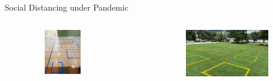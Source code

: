 \begin{frame}{Social Distancing under Pandemic}
\begin{itemize}
      \begin{columns}[c]  %
        \column{5.5cm}  %
        \begin{figure}[ht]
          \centering
          \includegraphics[width = 0.7\textwidth, height=0.5\textwidth]{./images/social_distancie_tape.jpg}
        \end{figure}
        \column{4.5cm}
        \scriptsize
        \begin{figure}[ht]
          \centering
          \includegraphics[width = 0.9\textwidth]{./images/socail_park.png}
        \end{figure}
        \end{columns} 
  \end{itemize}
  \end{frame}


